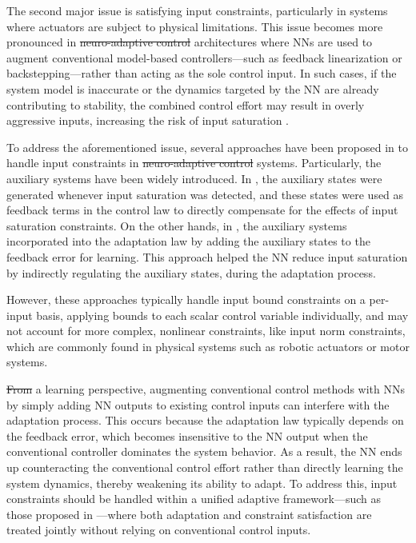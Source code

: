 \documentclass[letterpaper, journal]{IEEEtran}
\providecommand{\DIFadd}[1]{{\protect\color{blue}\uwave{#1}}} %
\providecommand{\DIFdel}[1]{{\protect\color{red}\sout{#1}}} %
\providecommand{\DIFaddbegin}{} %
\providecommand{\DIFaddend}{} %
\providecommand{\DIFdelbegin}{} %
\providecommand{\DIFdelend}{} %
\begin{document}
The second major issue is satisfying input constraints, particularly in systems where actuators are subject to physical limitations. 
This issue becomes more pronounced in \DIFdelbegin \DIFdel{neuro-adaptive control }\DIFdelend \DIFaddbegin \DIFadd{NAC }\DIFaddend architectures where NNs are used to augment conventional model-based controllers—such as feedback linearization or backstepping—rather than acting as the sole control input. 
In such cases, if the system model is inaccurate or the dynamics targeted by the NN are already contributing to stability, the combined control effort may result in overly aggressive inputs, increasing the risk of input saturation \cite{Khalil:2002aa}.

To address the aforementioned issue, several approaches have been proposed in \cite{Gao:2006aa,Arefinia:2020aa,He:2016aa,Peng:2020aa,Esfandiari:2014aa,Karason:1994aa,Esfandiari:2015aa} to handle input constraints in \DIFdelbegin \DIFdel{neuro-adaptive control }\DIFdelend \DIFaddbegin \DIFadd{NAC }\DIFaddend systems.
Particularly, the auxiliary systems have been widely introduced.
In \cite{Arefinia:2020aa,He:2016aa,Peng:2020aa}, the auxiliary states were generated whenever input saturation was detected, and these states were used as feedback terms in the control law to directly compensate for the effects of input saturation constraints.
On the other hands, in \cite{Esfandiari:2014aa,Karason:1994aa,Esfandiari:2015aa}, the auxiliary systems \DIFaddbegin \DIFadd{were }\DIFaddend incorporated into the adaptation law by adding the auxiliary states to the feedback error for learning.
This approach helped the NN reduce input saturation by indirectly regulating the auxiliary states, during the adaptation process.

However, these approaches typically handle input bound constraints on a per-input basis, \ie applying bounds to each scalar control variable individually, and may not account for more complex, nonlinear constraints, like input norm constraints, which are commonly found in physical systems such as robotic actuators or motor systems.

\DIFdelbegin \DIFdel{From }\DIFdelend \DIFaddbegin \DIFadd{Furthermore, from }\DIFaddend a learning perspective, augmenting conventional control methods with NNs by simply adding NN outputs to existing control inputs can interfere with the adaptation process. 
This occurs because the adaptation law typically depends on the feedback error, which becomes insensitive to the NN output when the conventional controller dominates the system behavior. 
As a result, the NN ends up counteracting the conventional control effort rather than directly learning the system dynamics, thereby weakening its ability to adapt.
To address this, input constraints should be handled within a unified adaptive framework—such as those proposed in \cite{Esfandiari:2014aa,Karason:1994aa,Esfandiari:2015aa}—where both adaptation and constraint satisfaction are treated jointly without relying on conventional control inputs.
\end{document}
